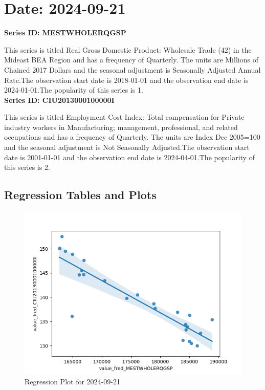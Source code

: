 \section{Date: 2024-09-21}
\noindent \textbf{Series ID: MESTWHOLERQGSP} 

\noindent This series is titled Real Gross Domestic Product: Wholesale Trade (42) in the Mideast BEA Region and has a frequency of Quarterly. The units are Millions of Chained 2017 Dollars and the seasonal adjustment is Seasonally Adjusted Annual Rate.The observation start date is 2018-01-01 and the observation end date is 2024-01-01.The popularity of this series is 1. \\ 

\noindent \textbf{Series ID: CIU2013000100000I} 

\noindent This series is titled Employment Cost Index: Total compensation for Private industry workers in Manufacturing; management, professional, and related occupations and has a frequency of Quarterly. The units are Index Dec 2005=100 and the seasonal adjustment is Not Seasonally Adjusted.The observation start date is 2001-01-01 and the observation end date is 2024-04-01.The popularity of this series is 2. \\ 

\subsection{Regression Tables and Plots}


\begin{figure}
\centering
\includegraphics[scale = 0.9]{plots/plot_2024-09-21.png}
\caption{Regression Plot for 2024-09-21}
\end{figure}
\newpage
